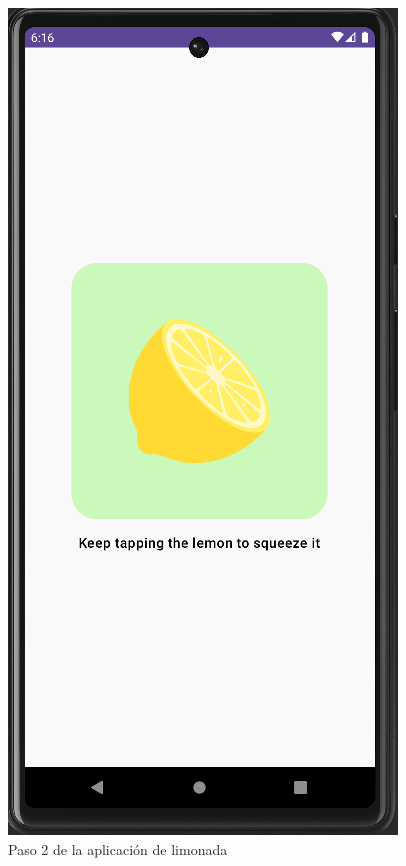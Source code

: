 \documentclass{article}
\begin{document}
    \begin{figure}[H]
        \centerline{\includegraphics[scale=0.2]{step2.png}}
        \caption{Paso 2 de la aplicación de limonada}
        \label{fig:step2}
    \end{figure}
\end{document}
